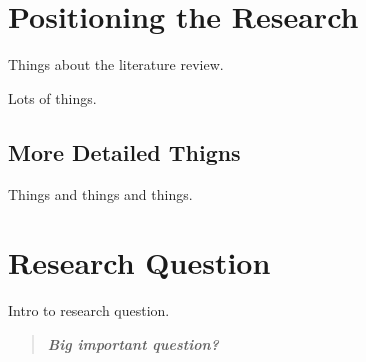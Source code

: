 \section{Positioning the Research}

Things about the literature review.
\par
\medskip
Lots of things.

\subsection{More Detailed Thigns}
Things and things and things.
\par
\medskip

\section{Research Question}

Intro to research question.

\begin{quote}
\textbf{\textit{Big important question?}}
\end{quote}
